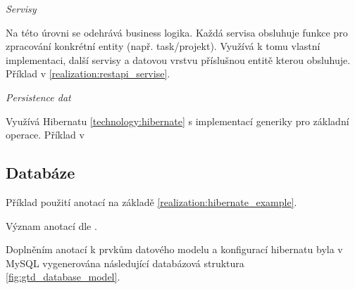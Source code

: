 \documentclass[thesis=B,czech]{FITthesis}[2012/06/26]
\begin{document}
\textit{Servisy}

Na této úrovni se odehrává business logika. Každá servisa obsluhuje funkce pro zpracování konkrétní entity (např. task/projekt). Využívá k tomu vlastní implementaci, další servisy a datovou vrstvu příslušnou entitě kterou obsluhuje. Příklad v \ref{realization:restapi_servise}.



\textit{Persistence dat}

Využívá Hibernatu \ref{technology:hibernate} s implementací generiky\cite{realization_hibernate_generic} pro základní operace. Příklad v 



\subsection{Databáze}

Příklad použití anotací na základě \ref{realization:hibernate_example}.



Význam anotací dle \cite{design_hibernate_annotations}.

Doplněním anotací k prvkům datového modelu a konfigurací hibernatu byla v MySQL vygenerována následující databázová struktura \ref{fig:gtd_database_model}.
\end{document}
